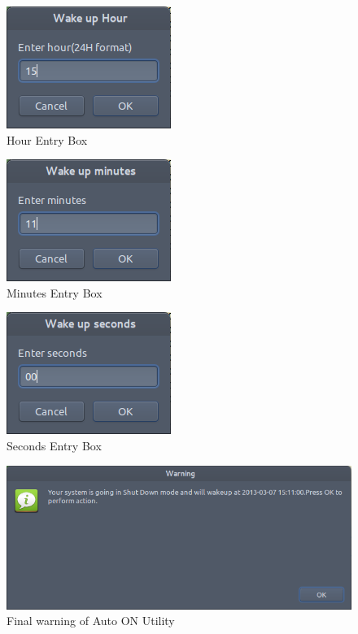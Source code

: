 \begin{figure}[h]
\begin{center}
  \includegraphics[scale=0.99] {20.png}
  \caption[Screenshot - Hour Entry Box]{Hour Entry Box}
\end{center}
\end{figure}
\begin{figure}[h]
\begin{center}
  \includegraphics[scale=0.99] {21.png}
  \caption[Screenshot - Minutes Entry Box]{Minutes Entry Box}
\end{center}
\end{figure}\begin{figure}[h]
\begin{center}
  \includegraphics[scale=0.99] {22.png}
  \caption[Screenshot - Seconds Entry Box]{Seconds Entry Box}
\end{center}
\end{figure}

\begin{figure}[h]
\begin{center}
  \includegraphics[scale=0.69] {23.png}
  \caption[Screenshot - Final warning of Auto ON Utility]{Final warning of Auto ON Utility}
\end{center}
\end{figure}

